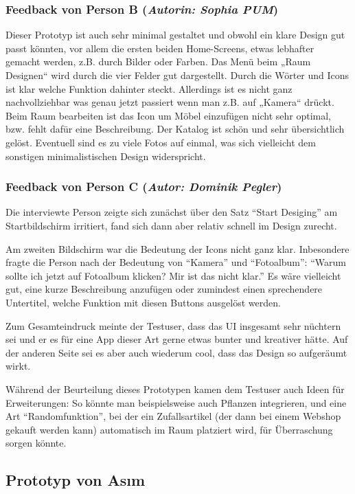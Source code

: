 \documentclass[12pt,paper=a4,oneside,hidelinks,headings=small,captions=heading,captions=nooneline]{scrartcl}
\begin{document}
\subsubsection{\textbf{Feedback von Person B} (\emph{Autorin: Sophia PUM})}
\label{sec:org93ca253}
Dieser Prototyp ist auch sehr minimal gestaltet und obwohl ein klare Design gut passt könnten, vor allem die ersten beiden Home-Screens, etwas lebhafter gemacht werden, z.B. durch Bilder oder Farben. Das Menü beim „Raum Designen“ wird durch die vier Felder gut dargestellt. Durch die Wörter und Icons ist klar welche Funktion dahinter steckt. Allerdings ist es nicht ganz nachvollziehbar was genau jetzt passiert wenn man z.B. auf „Kamera“ drückt. Beim Raum bearbeiten ist das Icon um Möbel einzufügen nicht sehr optimal, bzw. fehlt dafür eine Beschreibung. Der Katalog ist schön und sehr übersichtlich gelöst.  Eventuell sind es zu viele Fotos auf einmal, was sich vielleicht dem sonstigen minimalistischen Design widerspricht.
\subsubsection{\textbf{Feedback von Person C} (\emph{Autor: Dominik Pegler})}
\label{sec:org34b2364}

Die interviewte Person zeigte sich zunächst über den Satz "`Start
Desiging"' am Startbildschirm irritiert, fand sich dann aber relativ
schnell im Design zurecht.

Am zweiten Bildschirm war die Bedeutung der Icons nicht ganz
klar. Inbesondere fragte die Person nach der Bedeutung von "`Kamera"'
und "`Fotoalbum"': "`Warum sollte ich jetzt auf Fotoalbum klicken? Mir
ist das nicht klar."' Es wäre vielleicht gut, eine kurze Beschreibung
anzufügen oder zumindest einen sprechendere Untertitel, welche
Funktion mit diesen Buttons ausgelöst werden.

Zum Gesamteindruck meinte der Testuser, dass das UI insgesamt sehr
nüchtern sei und er es für eine App dieser Art gerne etwas bunter und
kreativer hätte. Auf der anderen Seite sei es aber auch wiederum cool,
dass das Design so aufgeräumt wirkt.

Während der Beurteilung dieses Prototypen kamen dem Testuser auch
Ideen für Erweiterungen: So könnte man beispielsweise auch Pflanzen
integrieren, und eine Art "`Randomfunktion"', bei der ein Zufallsartikel
(der dann bei einem Webshop gekauft werden kann) automatisch im Raum
platziert wird, für Überraschung sorgen könnte.

\subsection{Prototyp von Asım}
\label{sec:org15a76ed}
\end{document}
